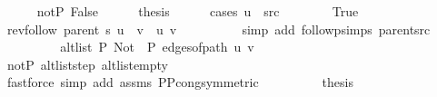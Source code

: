 \begin{isabellebody}
\ \ \ \ \isamarkupfalse%
\ not{\isacharunderscore}{\kern0pt}P{\isacharprime}{\kern0pt}{\isacharcolon}{\kern0pt}\ False\isanewline
\ \ \ \ \isamarkupfalse%
\ {\isacharquery}{\kern0pt}thesis\isanewline
\ \ \ \ \isamarkupfalse%
\ {\isacharparenleft}{\kern0pt}cases\ {\isachardoublequoteopen}u\ {\isacharequal}{\kern0pt}\ src{\isachardoublequoteclose}{\isacharparenright}{\kern0pt}\isanewline
\ \ \ \ \ \ \isamarkupfalse%
\ True\isanewline
\ \ \ \ \ \ \isamarkupfalse%
\ {\isachardoublequoteopen}rev{\isacharunderscore}{\kern0pt}follow\ {\isacharparenleft}{\kern0pt}parent\ s{\isacharparenright}{\kern0pt}\ u\ {\isacharat}{\kern0pt}\ {\isacharbrackleft}{\kern0pt}v{\isacharbrackright}{\kern0pt}\ {\isacharequal}{\kern0pt}\ {\isacharbrackleft}{\kern0pt}u{\isacharcomma}{\kern0pt}\ v{\isacharbrackright}{\kern0pt}{\isachardoublequoteclose}\isanewline
\ \ \ \ \ \ \ \ \isamarkupfalse%
\ {\isacharparenleft}{\kern0pt}simp\ add{\isacharcolon}{\kern0pt}\ follow{\isacharunderscore}{\kern0pt}psimps\ parent{\isacharunderscore}{\kern0pt}src{\isacharparenright}{\kern0pt}\isanewline
\ \ \ \ \ \ \isamarkupfalse%
\ \isamarkupfalse%
\ {\isachardoublequoteopen}alt{\isacharunderscore}{\kern0pt}list\ P{\isacharprime}{\kern0pt}{\isacharprime}{\kern0pt}\ {\isacharparenleft}{\kern0pt}Not\ {\isasymcirc}\ P{\isacharprime}{\kern0pt}{\isacharprime}{\kern0pt}{\isacharparenright}{\kern0pt}\ {\isacharparenleft}{\kern0pt}edges{\isacharunderscore}{\kern0pt}of{\isacharunderscore}{\kern0pt}path\ {\isacharbrackleft}{\kern0pt}u{\isacharcomma}{\kern0pt}\ v{\isacharbrackright}{\kern0pt}{\isacharparenright}{\kern0pt}{\isachardoublequoteclose}\isanewline
\ \ \ \ \ \ \ \ \isamarkupfalse%
\ not{\isacharunderscore}{\kern0pt}P{\isacharprime}{\kern0pt}\ alt{\isacharunderscore}{\kern0pt}list{\isacharunderscore}{\kern0pt}step\ alt{\isacharunderscore}{\kern0pt}list{\isacharunderscore}{\kern0pt}empty\isanewline
\ \ \ \ \ \ \ \ \isamarkupfalse%
\ {\isacharparenleft}{\kern0pt}fastforce\ simp\ add{\isacharcolon}{\kern0pt}\ assms{\isacharparenleft}{\kern0pt}{}{\isacharparenright}{\kern0pt}\ P{\isacharunderscore}{\kern0pt}P{\isacharprime}{\kern0pt}{\isacharprime}{\kern0pt}{\isacharunderscore}{\kern0pt}cong{\isacharbrackleft}{\kern0pt}symmetric{\isacharbrackright}{\kern0pt}{\isacharparenright}{\kern0pt}\isanewline
\ \ \ \ \ \ \isamarkupfalse%
\ \isamarkupfalse%
\ {\isacharquery}{\kern0pt}thesis\isanewline

\end{isabellebody}
